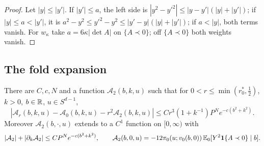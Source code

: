 \begin{proof}
Let $|y|\le|y'|$. If $|y'|\le a$, the left side is $|y^2-y'^2|\le|y-y'|(|y|+|y'|)$; if $|y|\le a<|y'|$, it is $a^2-y^2\le y'^2-y^2\le|y'-y|(|y|+|y'|)$; if $a<|y|$, both terms vanish. For $w_\kappa$ take $a=6\kappa|\det A|$ on $\{A\prec0\}$; off $\{A\prec0\}$ both weights vanish.
\end{proof}

\subsection{The fold expansion}\label{ssec:third-fold}

\begin{lemma}\label{lem:third-fold}
There are $C,c,N$ and a function $\mathcal A_2(b,k,u)$ such that for $0<r\le\min(r_0^*,\frac12)$, $k>0$, $b\in\mathbb R$, $u\in S^{d-1}$,
\begin{equation}\label{eq:third-F1}
|\mathcal A_r(b,k,u)-\mathcal A_0(b,k,u)-r^2\mathcal A_2(b,k,u)|\le Cr^3(1+k^{-1})P^Ne^{-c(b^2+k^2)}.
\end{equation}
Moreover $\mathcal A_2(b,\cdot,u)$ extends to a $C^1$ function on $[0,\infty)$ with
\begin{equation}\label{eq:third-F2}
|\mathcal A_2|+|\partial_k\mathcal A_2|\le CP^Ne^{-c(b^2+k^2)},\qquad \mathcal A_2(b,0,u)=-12\pi_0(u;v_0(b,0))\,\mathbb E_0[Y^2\mathbf 1\{A\prec0\}\mid b].
\end{equation}
\end{lemma}

